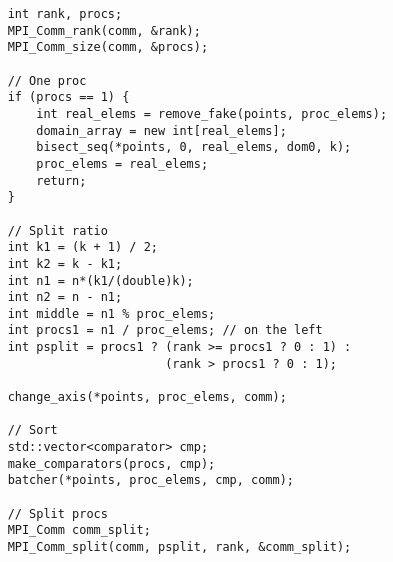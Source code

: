 \documentclass[oneside,final,14pt]{extreport}
\begin{document}
\begin{verbatim}
    int rank, procs;
    MPI_Comm_rank(comm, &rank);
    MPI_Comm_size(comm, &procs);

    // One proc
    if (procs == 1) {
        int real_elems = remove_fake(points, proc_elems);
        domain_array = new int[real_elems];
        bisect_seq(*points, 0, real_elems, dom0, k);
        proc_elems = real_elems;
        return;
    }

    // Split ratio
    int k1 = (k + 1) / 2;
    int k2 = k - k1;
    int n1 = n*(k1/(double)k);
    int n2 = n - n1;
    int middle = n1 % proc_elems;
    int procs1 = n1 / proc_elems; // on the left
    int psplit = procs1 ? (rank >= procs1 ? 0 : 1) :
                          (rank > procs1 ? 0 : 1);

    change_axis(*points, proc_elems, comm);

    // Sort
    std::vector<comparator> cmp;
    make_comparators(procs, cmp);
    batcher(*points, proc_elems, cmp, comm);

    // Split procs
    MPI_Comm comm_split;
    MPI_Comm_split(comm, psplit, rank, &comm_split);


\end{verbatim}
\end{document}
